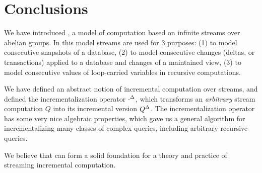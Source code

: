 \section{Conclusions}\label{sec:conclusions}%

We have introduced \dbsp, a model of computation based on infinite
streams over abelian groups.  In this model streams are used for 3
purposes: (1) to model consecutive snapshots of a database, (2) to
model consecutive changes (deltas, or transactions) applied to a
database and changes of a maintained view, (3) to model consecutive
values of loop-carried variables in recursive computations.

We have defined an abstract notion of incremental computation over
streams, and defined the incrementalization operator ${\cdot}^{\Delta}$,
which transforms an \emph{arbitrary} stream computation $Q$ into its
incremental version ${Q}^{\Delta}$.  The incrementalization operator has
some very nice algebraic properties, which gave us a general algorithm
for incrementalizing many classes of complex queries, including
arbitrary recursive queries.

We believe that \dbsp can form a solid foundation for a theory and practice of
streaming incremental computation.
